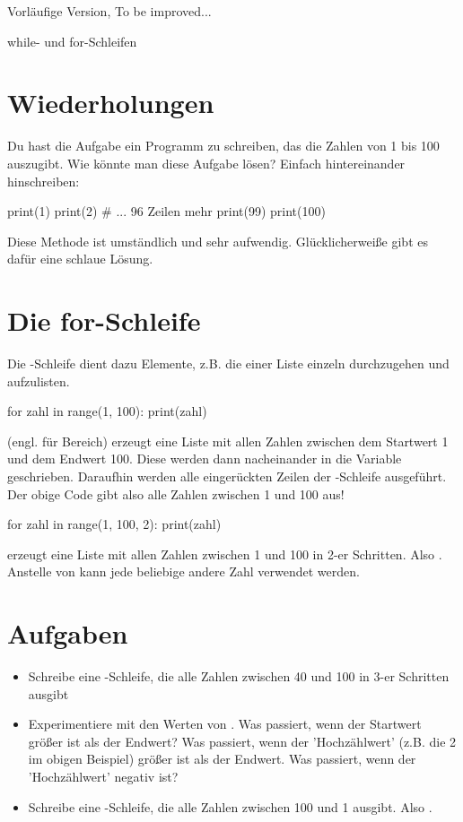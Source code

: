 \documentclass{\VorlagenPfad/coderdojokatext}
\newcommand{\Titel}{while- und for-Schleifen}
\begin{document}
{\huge Vorläufige Version, To be improved...}
\begin{center}
	{\huge \Titel}
\end{center}

\section{Wiederholungen} Du hast die Aufgabe ein Programm zu schreiben, das die Zahlen von 1 bis 100 auszugibt. Wie könnte man diese Aufgabe lösen? Einfach hintereinander hinschreiben:

\begin{pythoncode}
print(1)
print(2)
# ... 96 Zeilen mehr
print(99)
print(100)
\end{pythoncode}

Diese Methode ist umständlich und sehr aufwendig. Glücklicherweiße gibt es dafür eine schlaue Lösung.

\section{Die for-Schleife} Die -Schleife dient dazu Elemente, z.B. die einer Liste einzeln durchzugehen und aufzulisten.

\begin{pythoncode}
for zahl in range(1, 100):
	print(zahl)
\end{pythoncode}

 (engl. für Bereich) erzeugt eine Liste mit allen Zahlen zwischen dem Startwert 1 und dem Endwert 100. Diese werden dann nacheinander in die Variable  geschrieben. Daraufhin werden alle eingerückten Zeilen der -Schleife ausgeführt.
\\
Der obige Code gibt also alle Zahlen zwischen 1 und 100 aus!

\begin{pythoncode}
for zahl in range(1, 100, 2):
	print(zahl)
\end{pythoncode}
 erzeugt eine Liste mit allen Zahlen zwischen 1 und 100 in 2-er Schritten. Also . Anstelle von  kann jede beliebige andere Zahl verwendet werden.

\section{Aufgaben}
\begin{itemize}
	\item Schreibe eine -Schleife, die alle Zahlen zwischen 40 und 100 in 3-er Schritten ausgibt
	\item Experimentiere mit den Werten von . Was passiert, wenn der Startwert größer ist als der Endwert? Was passiert, wenn der 'Hochzählwert' (z.B. die 2 im obigen Beispiel) größer ist als der Endwert. Was passiert, wenn der 'Hochzählwert' negativ ist?
	\item Schreibe eine -Schleife, die alle Zahlen zwischen 100 und 1 ausgibt. Also .
\end{itemize}
\end{document}

